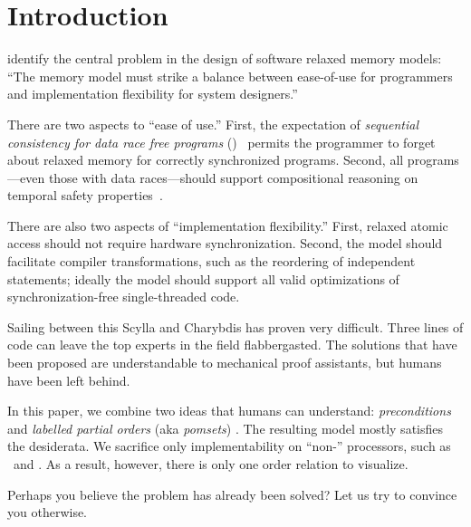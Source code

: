 \section{Introduction}
\label{sec:intro}
\citet{Manson:2005:JMM:1047659.1040336} identify the central problem in the
design of software relaxed memory models: ``The memory model must strike a
balance between ease-of-use for programmers and implementation flexibility
for system designers.''  


There are  two aspects to ``ease of use.''  First, the expectation of
\emph{sequential consistency for data race free programs}
(\drfsc)~\cite{DBLP:journals/tpds/AdveH93, DBLP:conf/isca/AdveH90} permits
the programmer to forget about relaxed memory for correctly synchronized
programs.  Second, all programs---even those with data races---should support
compositional reasoning on temporal safety
properties~\cite{PnueliSafety,Misra:1981:PNP:1313338.1313770,StarkSafety,Abadi:1993:CS:151646.151649}.

There are also two aspects of ``implementation flexibility.''  First, relaxed
atomic access should not require hardware synchronization.  Second, the model
should facilitate compiler transformations, such as the reordering of independent
statements; ideally the model should support all valid optimizations of
synchronization\hyp{}free single\hyp{}threaded code.

Sailing between this Scylla and Charybdis has proven very difficult.  Three
lines of code can leave the top experts in the field flabbergasted.  The
solutions that have been proposed are understandable to mechanical proof
assistants, but humans have been left behind.

In this paper, we combine two ideas that humans can understand: \emph{preconditions}
\cite{Hoare:1969:ABC:363235.363259} and \emph{labelled partial orders} (aka \emph{pomsets})
\cite{GISCHER1988199,Plotkin:1997:TSP:266557.266600}.  The resulting model
mostly satisfies the desiderata.  We sacrifice only implementability on
``non-\mca'' processors, such as \ppc\ and \armseven{}. As a result, however,
there is only one order relation to visualize.

Perhaps you believe the problem has already been solved?  Let us try to
convince you otherwise.

